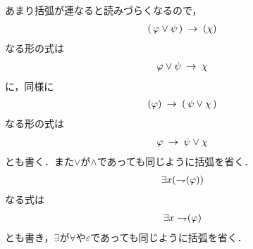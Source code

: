 	あまり括弧が連なると読みづらくなるので，
	\begin{align}
		(\, \varphi \vee \psi\, ) \hspace{0.25em}\rightarrow\hspace{0.25em} (\chi)
	\end{align}
	なる形の式は
	\begin{align}
		\varphi \vee \psi \hspace{0.25em}\rightarrow\hspace{0.25em} \chi
	\end{align}
	に，同様に
	\begin{align}
		(\varphi) \hspace{0.25em}\rightarrow\hspace{0.25em} (\, \psi \vee \chi\, )
	\end{align}
	なる形の式は
	\begin{align}
		\varphi \hspace{0.25em}\rightarrow\hspace{0.25em} \psi \vee \chi
	\end{align}
	とも書く．また$\vee$が$\wedge$であっても同じように括弧を省く．
	\begin{align}
		\exists x (\rightharpoondown\hspace{-0.25em} (\varphi))
	\end{align}
	なる式は
	\begin{align}
		\exists x \rightharpoondown\hspace{-0.25em} (\varphi)
	\end{align}
	とも書き，$\exists$が$\forall$や$\varepsilon$であっても同じように括弧を省く．